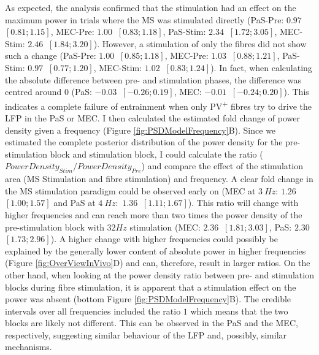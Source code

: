 \documentclass[
  12pt,
  a4paper,
  openany]{book}
\begin{document}
\noindent As expected, the analysis confirmed that the stimulation had an effect on the maximum power in trials where the MS was stimulated directly (PaS-Pre: \(0.97\ \) \([0.81; 1.15]\), MEC-Pre: \(1.00\ \) \([0.83; 1.18]\), PaS-Stim: \(2.34\ \) \([1.72; 3.05]\), MEC-Stim: \(2.46\ \) \([1.84; 3.20]\)). However, a stimulation of only the fibres did not show such a change (PaS-Pre: \(1.00\ \) \([0.85; 1.18]\), MEC-Pre: \(1.03\ \) \([0.88; 1.21]\), PaS-Stim: \(0.97\ \) \([0.77; 1.20]\), MEC-Stim: \(1.02\ \) \([0.83; 1.24]\)). In fact, when calculating the absolute difference between pre- and stimulation phases, the difference was centred around \(0\) (PaS: \(-0.03\ \) \([-0.26; 0.19]\), MEC: \(-0.01\ \) \([-0.24; 0.20]\)). This indicates a complete failure of entrainment when only PV\textsuperscript{+} fibres try to drive the LFP in the PaS or MEC. I then calculated the estimated fold change of power density given a frequency (Figure \ref{fig:PSDModelFrequency}B). Since we estimated the complete posterior distribution of the power density for the pre-stimulation block and stimulation block, I could calculate the ratio (\(PowerDensity_{Stim}/PowerDensity_{Pre}\)) and compare the effect of the stimulation area (MS Stimulation and fibre stimulation) and frequency. A clear fold change in the MS stimulation paradigm could be observed early on (MEC at \(3\ Hz\): \(1.26\ \) \([1.00; 1.57]\) and PaS at \(4\ Hz:\) \(1.36\ \) \([1.11; 1.67]\)). This ratio will change with higher frequencies and can reach more than two times the power density of the pre-stimulation block with \(32Hz\) stimulation (MEC: \(2.36\ \) \([1.81; 3.03]\), PaS: \(2.30\ \) \([1.73; 2.96]\)). A higher change with higher frequencies could possibly be explained by the generally lower content of absolute power in higher frequencies (Figure \ref{fig:OverViewInVivo}D) and can, therefore, result in larger ratios. On the other hand, when looking at the power density ratio between pre- and stimulation blocks during fibre stimulation, it is apparent that a stimulation effect on the power was absent (bottom Figure \ref{fig:PSDModelFrequency}B). The credible intervals over all frequencies included the ratio \(1\) which means that the two blocks are likely not different. This can be observed in the PaS and the MEC, respectively, suggesting similar behaviour of the LFP and, possibly, similar mechanisms.
\end{document}
